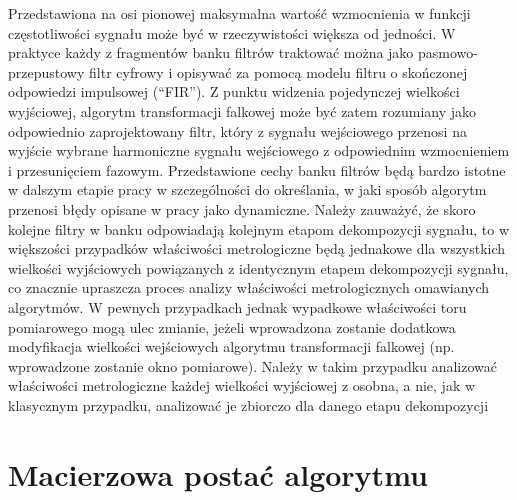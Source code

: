 Przedstawiona na osi pionowej maksymalna wartość wzmocnienia w funkcji częstotliwości sygnału może być w rzeczywistości większa od jedności. W praktyce każdy z fragmentów banku filtrów traktować można jako pasmowo-przepustowy filtr cyfrowy i opisywać za pomocą modelu filtru o skończonej odpowiedzi impulsowej (\enquote{FIR}). Z punktu widzenia pojedynczej wielkości wyjściowej, algorytm transformacji falkowej może być zatem rozumiany jako odpowiednio zaprojektowany filtr, który z sygnału wejściowego przenosi na wyjście wybrane harmoniczne sygnału wejściowego z odpowiednim wzmocnieniem i przesunięciem fazowym. Przedstawione cechy banku filtrów będą bardzo istotne w dalszym etapie pracy w szczególności do określania, w jaki sposób algorytm przenosi błędy opisane w pracy jako dynamiczne. Należy zauważyć, że skoro kolejne filtry w banku odpowiadają kolejnym etapom dekompozycji sygnału, to w większości przypadków właściwości metrologiczne będą jednakowe dla wszystkich wielkości wyjściowych powiązanych z identycznym etapem dekompozycji sygnału, co znacznie upraszcza proces analizy właściwości metrologicznych omawianych algorytmów. W pewnych przypadkach jednak wypadkowe właściwości toru pomiarowego mogą ulec zmianie, jeżeli wprowadzona zostanie dodatkowa modyfikacja wielkości wejściowych algorytmu transformacji falkowej (np. wprowadzone zostanie okno pomiarowe). Należy w takim przypadku analizować właściwości metrologiczne każdej wielkości wyjściowej z osobna, a nie, jak w klasycznym przypadku, analizować je zbiorczo dla danego etapu dekompozycji

\section{Macierzowa postać algorytmu}

